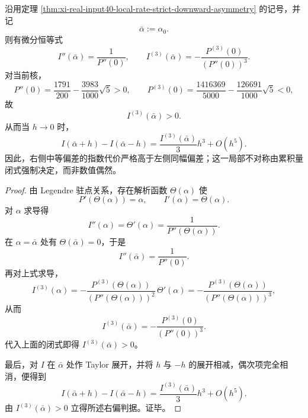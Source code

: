 \begin{corollary}[局部速率函数的微分刚性与右偏判据]\label{cor:xi-real-input40-local-rate-derivative-rigidity}
沿用定理 \ref{thm:xi-real-input40-local-rate-strict-downward-asymmetry} 的记号，并记
\[
\bar\alpha:=\alpha_0.
\]
则有微分恒等式
\[
\boxed{\;
I''(\bar\alpha)=\frac{1}{P''(0)},
\qquad
I^{(3)}(\bar\alpha)=-\frac{P^{(3)}(0)}{(P''(0))^3}.\;}
\]
对当前核，
\[
P''(0)=\frac{1791}{200}-\frac{3983}{1000}\sqrt5>0,
\qquad
P^{(3)}(0)=\frac{1416369}{5000}-\frac{126691}{1000}\sqrt5<0,
\]
故
\[
I^{(3)}(\bar\alpha)>0.
\]
从而当 \(h\to 0\) 时，
\[
\boxed{\;
I(\bar\alpha+h)-I(\bar\alpha-h)
=
\frac{I^{(3)}(\bar\alpha)}{3}h^3+O(h^5).\;}
\]
因此，右侧中等偏差的指数代价严格高于左侧同幅偏差；这一局部不对称由累积量闭式强制决定，而非数值偶然。
\end{corollary}
\begin{proof}
由 Legendre 驻点关系，存在解析函数 \(\Theta(\alpha)\) 使
\[
P'(\Theta(\alpha))=\alpha,
\qquad
I'(\alpha)=\Theta(\alpha).
\]
对 \(\alpha\) 求导得
\[
I''(\alpha)=\Theta'(\alpha)=\frac{1}{P''(\Theta(\alpha))}.
\]
在 \(\alpha=\bar\alpha\) 处有 \(\Theta(\bar\alpha)=0\)，于是
\[
I''(\bar\alpha)=\frac{1}{P''(0)}.
\]
再对上式求导，
\[
I^{(3)}(\alpha)
=
-\frac{P^{(3)}(\Theta(\alpha))}{(P''(\Theta(\alpha)))^2}\,\Theta'(\alpha)
=
-\frac{P^{(3)}(\Theta(\alpha))}{(P''(\Theta(\alpha)))^3},
\]
从而
\[
I^{(3)}(\bar\alpha)=-\frac{P^{(3)}(0)}{(P''(0))^3}.
\]
代入上面的闭式即得 \(I^{(3)}(\bar\alpha)>0\)。

最后，对 \(I\) 在 \(\bar\alpha\) 处作 Taylor 展开，并将 \(h\) 与 \(-h\) 的展开相减，偶次项完全相消，便得到
\[
I(\bar\alpha+h)-I(\bar\alpha-h)
=
\frac{I^{(3)}(\bar\alpha)}{3}h^3+O(h^5).
\]
由 \(I^{(3)}(\bar\alpha)>0\) 立得所述右偏判据。证毕。
\end{proof}

\endinput
